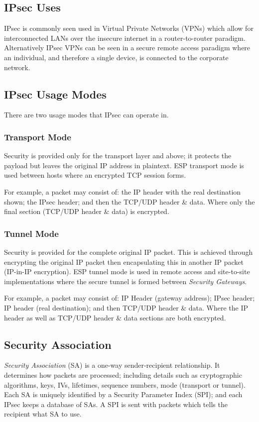 \subsection{IPsec Uses}
IPsec is commonly seen used in Virtual Private Networks (VPNs) which allow for interconnected LANs over the insecure internet in a router-to-router paradigm. Alternatively IPsec VPNs can be seen in a secure remote access paradigm where an individual, and therefore a single device, is connected to the corporate network.

\subsection{IPsec Usage Modes}
There are two usage modes that IPsec can operate in. 

\subsubsection{Transport Mode}
Security is provided only for the transport layer and above; it protects the payload but leaves the original IP address in plaintext. ESP transport mode is used between hosts where an encrypted TCP session forms. 

For example, a packet may consist of: the IP header with the real destination shown; the IPsec header; and then the TCP/UDP header \& data. Where only the final section (TCP/UDP header \& data) is encrypted.

\subsubsection{Tunnel Mode}
Security is provided for the complete original IP packet. This is achieved through encrypting the original IP packet then encapsulating this in another IP packet (IP-in-IP encryption). ESP tunnel mode is used in remote access and site-to-site implementations where the secure tunnel is formed between \textit{Security Gateways}. 

For example, a packet may consist of: IP Header (gateway address); IPsec header; IP header (real destination); and then TCP/UDP header \& data. Where the IP header as well as TCP/UDP header \& data sections are both encrypted.

\subsection{Security Association}
\textit{Security Association} (SA) is a one-way sender-recipient relationship. It determines how packets are processed; including details such as cryptographic algorithms, keys, IVs, lifetimes, sequence numbers, mode (transport or tunnel). Each SA is uniquely identified by a Security Parameter Index (SPI); and each IPsec keeps a database of SAs. A SPI is sent with packets which tells the recipient what SA to use. 

